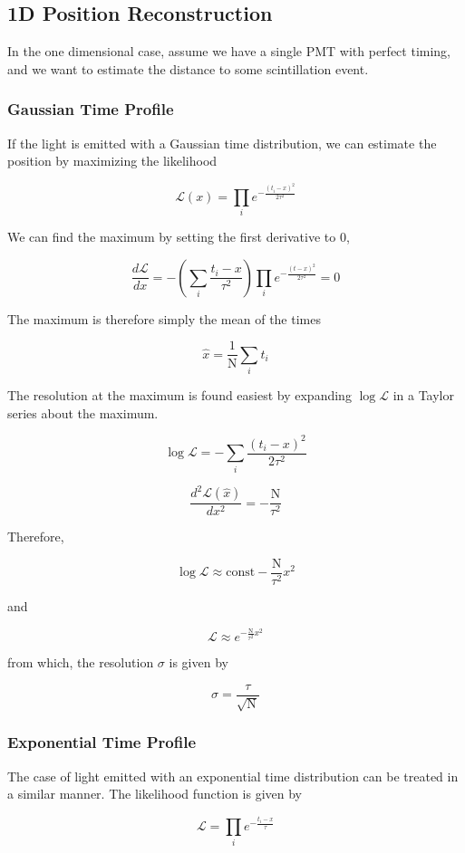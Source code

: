 \documentclass{article}
\newcommand{\like}{\mathscr{L}}
\newcommand{\N}{\mathrm{N}}
\begin{document}
\subsection{1D Position Reconstruction}

In the one dimensional case, assume we have a single PMT with perfect timing,
and we want to estimate the distance to some scintillation event.

\subsubsection{Gaussian Time Profile}
If the light is emitted with a Gaussian time distribution, we can estimate the
position by maximizing the likelihood

\[
    \like(x) = \prod_i e^{-\frac{(t_i-x)^2}{2 \tau^2}}
\]

We can find the maximum by setting the first derivative to 0,

\[
    \frac{d\like}{dx} = -\left(\sum_i \frac{t_i - x}{\tau^2} \right) \prod_i
    e^{-\frac{(t-x)^2}{2 \tau^2}} = 0
\]

The maximum is therefore simply the mean of the times

\[
    \hat{x} = \frac{1}{\N} \sum_i t_i
\]

The resolution at the maximum is found easiest by expanding $\log{\like}$ in a
Taylor series about the maximum.

\[
    \log{\like} = - \sum_i \frac{(t_i-x)^2}{2 \tau^2}
\]

\[
    \frac{d^2\like(\hat{x})}{dx^2} = -\frac{\N}{\tau^2}
\]

Therefore,

\[
    \log{\like} \approx \mathrm{const} - \frac{\N}{\tau^2} x^2
\]

and

\[
    \like \approx e^{-\frac{\N}{\tau^2} x^2}
\]

from which, the resolution $\sigma$ is given by

\[
    \sigma = \frac{\tau}{\sqrt{\N}}
\]

\subsubsection{Exponential Time Profile}

The case of light emitted with an exponential time distribution can be treated
in a similar manner. The likelihood function is given by

\[
    \like = \prod_i e^{-\frac{t_i - x}{\tau}}
\]
\end{document}
